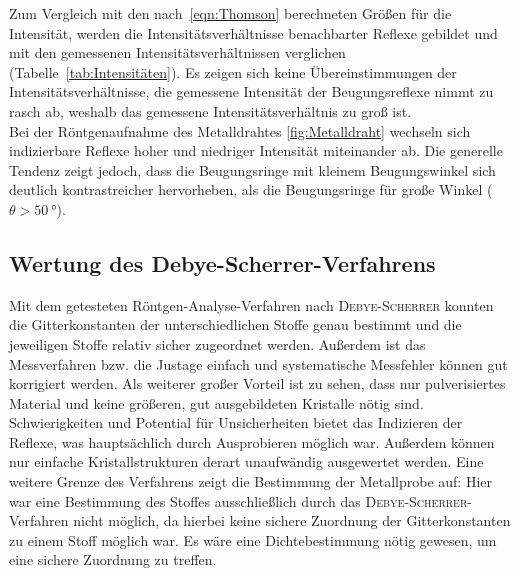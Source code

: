 \documentclass[a4paper,twoside,final]{article}
\begin{document}
Zum Vergleich mit den nach~\eqref{eqn:Thomson} berechneten Größen für die Intensität, werden die Intensitätsverhältnisse benachbarter Reflexe gebildet und mit den gemessenen Intensitätsverhältnissen verglichen (Tabelle~\ref{tab:Intensitäten}). Es zeigen sich keine Übereinstimmungen der Intensitätsverhältnisse, die gemessene Intensität der Beugungsreflexe nimmt zu rasch ab, weshalb das gemessene Intensitätsverhältnis zu groß ist.\\
Bei der Röntgenaufnahme des Metalldrahtes \ref{fig:Metalldraht} wechseln sich indizierbare Reflexe hoher und niedriger Intensität miteinander ab. Die generelle Tendenz zeigt jedoch, dass die Beugungsringe mit kleinem Beugungswinkel sich deutlich kontrastreicher hervorheben, als die Beugungsringe für große Winkel ($\theta > \SI{50}{\degree}$).

\subsection{Wertung des Debye-Scherrer-Verfahrens}
Mit dem getesteten Röntgen-Analyse-Verfahren nach \textsc{Debye-Scherrer} konnten die Gitterkonstanten der unterschiedlichen Stoffe genau bestimmt und die jeweiligen Stoffe relativ sicher zugeordnet werden. Außerdem ist das Messverfahren bzw. die Justage einfach und systematische Messfehler können gut korrigiert werden. Als weiterer großer Vorteil ist zu sehen, dass nur pulverisiertes Material und keine größeren, gut ausgebildeten Kristalle nötig sind.\\
Schwierigkeiten und Potential für Unsicherheiten bietet das Indizieren der Reflexe, was hauptsächlich durch Ausprobieren möglich war. Außerdem können nur einfache Kristallstrukturen derart unaufwändig ausgewertet werden. Eine weitere Grenze des Verfahrens zeigt die Bestimmung der Metallprobe auf: Hier war eine Bestimmung des Stoffes ausschließlich durch das \textsc{Debye-Scherrer}-Verfahren nicht möglich, da hierbei keine sichere Zuordnung der Gitterkonstanten zu einem Stoff möglich war. Es wäre eine Dichtebestimmung nötig gewesen, um eine sichere Zuordnung zu treffen.


\end{document}
